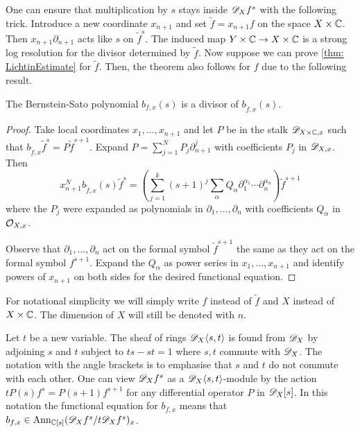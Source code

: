 One can ensure that multiplication by $s$ stays inside $\mathscr{D}_X f^s$ with the following trick.
Introduce a new coordinate $x_{n+1}$ and set $\widetilde{f}= x_{n+1}f$ on the space $X\times \mathbb{C}$.
Then $x_{n+1}\partial_{n+1}$ acts like $s$ on $\widetilde{f}^s$.
The induced map $Y\times \mathbb{C} \to X\times \mathbb{C}$ is a strong log resolution for the divisor determined by $\widetilde{f}$.
Now suppose we can prove \cref{thm: LichtinEstimate} for $\widetilde{f}$.
Then, the theorem also follows for $f$ due to the following result.
\begin{lemma}\label{lem: BernsteinTilde}
  The Bernstein-Sato polynomial $b_{f,x}(s)$ is a divisor of $b_{\widetilde{f},x}(s)$.
\end{lemma}
\begin{proof}
  Take local coordinates $x_1,\ldots, x_{n+1}$ and let $P$ be in the stalk $\mathscr{D}_{X\times \mathbb{C},x}$ such that $b_{\widetilde{f},x} \widetilde{f}^s = P \widetilde{f}^{s+1}$.
  Expand $P = \sum_{j=1}^N P_j  \partial_{n+1}^{j}$
  with coefficients $P_j$ in $\mathscr{D}_{X,x}$.
  Then
  $$x_{n+1}^N b_{\widetilde{f},x}(s) \widetilde{f}^s = \left(\sum_{j=1}^k (s + 1)^{j} \sum_\alpha Q_{\alpha} \partial_1^{\alpha_1}\cdots \partial_n^{\alpha_n} \right)\widetilde{f}^{s+1}$$
  where the $P_j$ were expanded as polynomials in $\partial_1,\ldots,\partial_n$ with coefficients $Q_{\alpha}$ in $\mathcal{O}_{X,x}$.

  Observe that $\partial_1,\ldots, \partial_n$ act on the formal symbol $\widetilde{f}^{s+1}$ the same as they act on the formal symbol $f^{s+1}$.
  Expand the $Q_{\alpha}$ as power series in $x_1,\ldots,x_{n+1}$ and identify powers of $x_{n+1}$ on both sides for the desired functional equation.
\end{proof}
For notational simplicity we will simply write $f$ instead of $\widetilde{f}$ and $X$ instead of $X\times \mathbb{C}$.
The dimension of $X$ will still be denoted with $n$.

Let $t$ be a new variable.
The sheaf of rings $\mathscr{D}_X\langle s,t\rangle$ is found from $\mathscr{D}_X$ by adjoining $s$ and $t$ subject to $ts -st = 1$ where $s,t$ commute with $\mathscr{D}_X$.
The notation with the angle brackets is to emphasise that $s$ and $t$ do not commute with each other.
One can view $\mathscr{D}_X f^s$ as a $\mathscr{D}_X\langle s,t\rangle$-module by the action $t P(s)f^s = P(s+1) f^{s+1}$ for any differential operator $P$ in $\mathscr{D}_X[s]$.
In this notation the functional equation for $b_{f,x}$ means that $b_{f,x}\in \operatorname{Ann}_{\mathbb{C}[s]} (\mathscr{D}_X f^s / t \mathscr{D}_X f^s)_x$.

